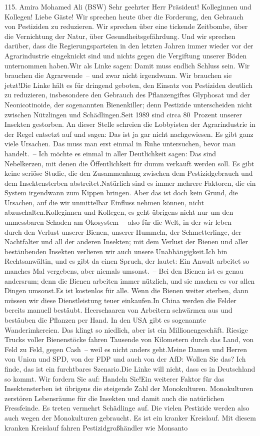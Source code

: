 \documentclass{article}
\begin{document}
	115. Amira Mohamed Ali (BSW) Sehr geehrter Herr Präsident! Kolleginnen und Kollegen! Liebe Gäste! Wir sprechen heute über die Forderung, den Gebrauch von Pestiziden zu reduzieren. Wir sprechen über eine tickende Zeitbombe, über die Vernichtung der Natur, über Gesundheitsgefährdung. Und wir sprechen darüber, dass die Regierungsparteien in den letzten Jahren immer wieder vor der Agrarindustrie eingeknickt sind und nichts gegen die Vergiftung unserer Böden unternommen haben.Wir als Linke sagen: Damit muss endlich Schluss sein. Wir brauchen die Agrarwende – und zwar nicht irgendwann. Wir brauchen sie jetzt!Die Linke hält es für dringend geboten, den Einsatz von Pestiziden deutlich zu reduzieren, insbesondere den Gebrauch des Pflanzengiftes Glyphosat und der Neonicotinoide, der sogenannten Bienenkiller; denn Pestizide unterscheiden nicht zwischen Nützlingen und Schädlingen.Seit 1989 sind circa 80 Prozent unserer Insekten gestorben. An dieser Stelle schreien die Lobbyisten der Agrarindustrie in der Regel entsetzt auf und sagen: Das ist ja gar nicht nachgewiesen. Es gibt ganz viele Ursachen. Das muss man erst einmal in Ruhe untersuchen, bevor man handelt. – Ich möchte es einmal in aller Deutlichkeit sagen: Das sind Nebelkerzen, mit denen die Öffentlichkeit für dumm verkauft werden soll. Es gibt keine seriöse Studie, die den Zusammenhang zwischen dem Pestizidgebrauch und dem Insektensterben abstreitet.Natürlich sind es immer mehrere Faktoren, die ein System irgendwann zum Kippen bringen. Aber das ist doch kein Grund, die Ursachen, auf die wir unmittelbar Einfluss nehmen können, nicht abzuschalten.Kolleginnen und Kollegen, es geht übrigens nicht nur um den unmessbaren Schaden am Ökosystem – also für die Welt, in der wir leben – durch den Verlust unserer Bienen, unserer Hummeln, der Schmetterlinge, der Nachtfalter und all der anderen Insekten; mit dem Verlust der Bienen und aller bestäubenden Insekten verlieren wir auch unsere Unabhängigkeit.Ich bin Rechtsanwältin, und es gibt da einen Spruch, der lautet: Ein Anwalt arbeitet so manches Mal vergebens, aber niemals umsonst. – Bei den Bienen ist es genau andersrum; denn die Bienen arbeiten immer nützlich, und sie machen es vor allen Dingen umsonst.Es ist kostenlos für alle. Wenn die Bienen weiter sterben, dann müssen wir diese Dienstleistung teuer einkaufen.In China werden die Felder bereits manuell bestäubt. Heerschaaren von Arbeitern schwärmen aus und bestäuben die Pflanzen per Hand. In den USA gibt es sogenannte Wanderimkereien. Das klingt so niedlich, aber ist ein Millionengeschäft. Riesige Trucks voller Bienenstöcke fahren Tausende von Kilometern durch das Land, von Feld zu Feld, gegen Cash – weil es nicht anders geht.Meine Damen und Herren von Union und SPD, von der FDP und auch von der AfD: Wollen Sie das? Ich finde, das ist ein furchtbares Szenario.Die Linke will nicht, dass es in Deutschland so kommt. Wir fordern Sie auf: Handeln Sie!Ein weiterer Faktor für das Insektensterben ist übrigens die steigende Zahl der Monokulturen. Monokulturen zerstören Lebensräume für die Insekten und damit auch die natürlichen Fressfeinde. Es treten vermehrt Schädlinge auf. Die vielen Pestizide werden also auch wegen der Monokulturen gebraucht. Es ist ein kranker Kreislauf. Mit diesem kranken Kreislauf fahren Pestizidgroßhändler wie Monsanto 
\end{document}
